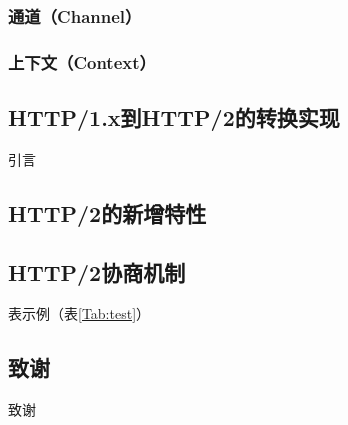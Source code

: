 \documentclass[twoside]{CUGThesis}
\begin{document}
	\subsubsection{通道（Channel）}
	\subsubsection{上下文（Context）}
	
	
	
	\begin{spacing}{2}
		\section{HTTP/1.x到HTTP/2的转换实现}
	\end{spacing}
	引言
	\subsection{HTTP/2的新增特性}
	
	\subsection{HTTP/2协商机制}
	表示例（表\ref{Tab:test}）

	\begin{spacing}{2}
		\section{}
	\end{spacing}
	
	
	\begin{spacing}{2}
		\section*{致谢}
	\end{spacing}
	
	致谢
	
	\clearpage
	
	
	
\end{document}

